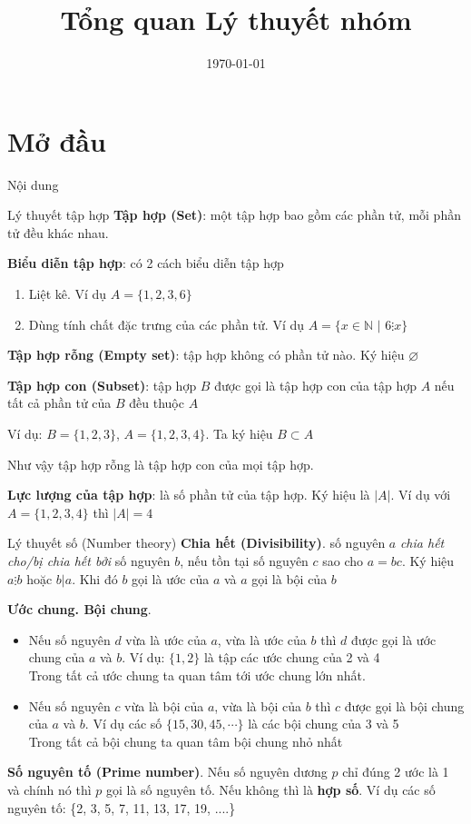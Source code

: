 \documentclass{beamer}
\title{Tổng quan Lý thuyết nhóm}
\date{\today}
\begin{document}
\frame{\titlepage}
\section{Mở đầu}
\begin{frame}{Nội dung}
    \tableofcontents[
        currentsection,
        sectionstyle=show/shaded,
        subsectionstyle=show/show/hide
    ]
\end{frame}
\begin{frame}{Lý thuyết tập hợp}
\textbf{Tập hợp (Set)}: một tập hợp bao gồm các phần tử, mỗi phần tử đều khác nhau. 

\pause
\textbf{Biểu diễn tập hợp}: có 2 cách biểu diễn tập hợp
\begin{enumerate}
    \item Liệt kê. Ví dụ $A = \{1, 2, 3, 6\}$
    \item Dùng tính chất đặc trưng của các phần tử. Ví dụ $A = \{x \in \mathbb{N} \text{  |  } 6 \vdots x\}$
\end{enumerate}

\pause
\textbf{Tập hợp rỗng (Empty set)}: tập hợp không có phần tử nào. Ký hiệu $\varnothing$

\pause
\textbf{Tập hợp con (Subset)}: tập hợp $B$ được gọi là tập hợp con của tập hợp $A$ nếu tất cả phần tử của $B$ đều thuộc $A$

Ví dụ: $B=\{1, 2, 3\}$, $A=\{1, 2, 3, 4\}$. Ta ký hiệu $B \subset A$

Như vậy tập hợp rỗng là tập hợp con của mọi tập hợp.

\pause
\textbf{Lực lượng của tập hợp}: là số phần tử của tập hợp. Ký hiệu là $|A|$. Ví dụ với $A=\{1,2,3,4\}$ thì $|A|=4$
\end{frame}

\begin{frame}{Lý thuyết số (Number theory)}
    \textbf{Chia hết (Divisibility)}. số nguyên $a$ \textit{chia hết cho/bị chia hết bởi} số nguyên $b$, nếu tồn tại số nguyên $c$ sao cho $a = b c$. Ký hiệu $a \vdots b$ hoặc $b | a$. Khi đó $b$ gọi là ước của $a$ và $a$ gọi là bội của $b$ \pause
    
    \textbf{Ước chung. Bội chung}. 
    \begin{itemize}
        \item Nếu số nguyên $d$ vừa là ước của $a$, vừa là ước của $b$ thì $d$ được gọi là ước chung của $a$ và $b$. Ví dụ: $\{1, 2\}$ là tập các ước chung của 2 và 4 \\ Trong tất cả ước chung ta quan tâm tới ước chung lớn nhất. 
        \item Nếu số nguyên $c$ vừa là bội của $a$, vừa là bội của $b$ thì $c$ được gọi là bội chung của $a$ và $b$. Ví dụ các số $\{15, 30, 45, \cdots \}$ là các bội chung của 3 và 5 \\ Trong tất cả bội chung ta quan tâm bội chung nhỏ nhất
    \end{itemize}
    \pause
    \textbf{Số nguyên tố (Prime number)}. Nếu số nguyên dương $p$ chỉ đúng 2 ước là 1 và chính nó thì $p$ gọi là số nguyên tố. Nếu không thì là \textbf{hợp số}. Ví dụ các số nguyên tố: \{2, 3, 5, 7, 11, 13, 17, 19, ....\}
\end{frame}
\end{document}
